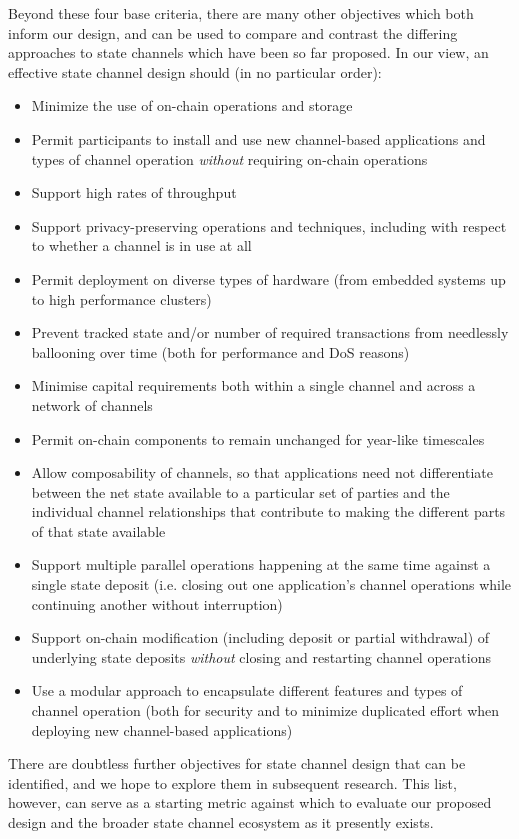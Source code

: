 \documentclass[prb,floatfix,reprint,nofootinbib,amsmath,amssymb,epsfig,pre,floats,letterpaper,groupedaffiliation,tightenlines,allcolors=blue,11pt]{revtex4}
\theoremstyle{definition}
\theoremstyle{definition}
\theoremstyle{definition}
\begin{document}
Beyond these four base criteria, there are many other objectives which both inform our design, and can be used to compare and contrast the differing approaches to state channels which have been so far proposed.  In our view, an effective state channel design should (in no particular order):
\begin{itemize}
\item Minimize the use of on-chain operations and storage
\item Permit participants to install and use new channel-based applications and types of channel operation \textit{without} requiring on-chain operations
\item Support high rates of throughput
\item Support privacy-preserving operations and techniques, including with respect to whether a channel is in use at all
\item Permit deployment on diverse types of hardware (from embedded systems up to high performance clusters)
\item Prevent tracked state and/or number of required transactions from needlessly ballooning over time (both for performance and DoS reasons)
\item Minimise capital requirements both within a single channel and across a network of channels
\item Permit on-chain components to remain unchanged for year-like timescales
\item Allow composability of channels, so that applications need not differentiate between the net state available to a particular set of parties and the individual channel relationships that contribute to making the different parts of that state available
\item Support multiple parallel operations happening at the same time against a single state deposit (i.e. closing out one application's channel operations while continuing another without interruption)
\item Support on-chain modification (including deposit or partial withdrawal) of underlying state deposits \textit{without} closing and restarting channel operations
\item Use a modular approach to encapsulate different features and types of channel operation (both for security and to minimize duplicated effort when deploying new channel-based applications)
\end{itemize}

There are doubtless further objectives for state channel design that can be identified, and we hope to explore them in subsequent research.  This list, however, can serve as a starting metric against which to evaluate our proposed design and the broader state channel ecosystem as it presently exists.
\end{document}
